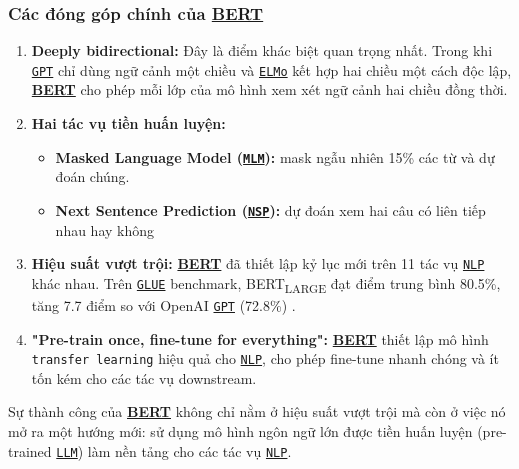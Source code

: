 \subsubsection{Các đóng góp chính của \hyperref[acro:bert]{\textbf{BERT}}}
\begin{enumerate}
    \item \textbf{Deeply bidirectional:} Đây là điểm khác biệt quan trọng nhất. Trong khi \hyperref[acro:gpt]{\texttt{GPT}} chỉ dùng ngữ cảnh một chiều và \hyperref[acro:elmo]{\texttt{ELMo}} kết hợp hai chiều một cách độc lập, \hyperref[acro:bert]{\textbf{BERT}} cho phép mỗi lớp của mô hình xem xét ngữ cảnh hai chiều đồng thời.
    
    \item \textbf{Hai tác vụ tiền huấn luyện:}
    \begin{itemize}
        \item \textbf{Masked Language Model (\hyperref[acro:mlm]{\texttt{MLM}}):} mask ngẫu nhiên 15\% các từ và dự đoán chúng. 
        \item \textbf{Next Sentence Prediction (\hyperref[acro:nsp]{\texttt{NSP}}):} dự đoán xem hai câu có liên tiếp nhau hay không
    \end{itemize}
    
    \item \textbf{Hiệu suất vượt trội:} \hyperref[acro:bert]{\textbf{BERT}} đã thiết lập kỷ lục mới trên 11 tác vụ \hyperref[acro:nlp]{\texttt{NLP}} khác nhau. Trên \hyperref[acro:glue]{\texttt{GLUE}} benchmark, BERT\textsubscript{LARGE} đạt điểm trung bình 80.5\%, tăng 7.7 điểm so với OpenAI \hyperref[acro:gpt]{\texttt{GPT}} (72.8\%) \cite{devlin2018bert}.
    
    \item \textbf{"Pre-train once, fine-tune for everything":} \hyperref[acro:bert]{\textbf{BERT}} thiết lập mô hình \texttt{transfer learning} hiệu quả cho \hyperref[acro:nlp]{\texttt{NLP}}, cho phép fine-tune nhanh chóng và ít tốn kém cho các tác vụ downstream.
\end{enumerate}

Sự thành công của \hyperref[acro:bert]{\textbf{BERT}} không chỉ nằm ở hiệu suất vượt trội mà còn ở việc nó mở ra một hướng mới: sử dụng mô hình ngôn ngữ lớn được tiền huấn luyện (pre-trained \hyperref[acro:llm]{\texttt{LLM}}) làm nền tảng cho các tác vụ \hyperref[acro:nlp]{\texttt{NLP}}.

